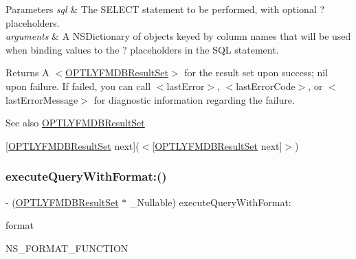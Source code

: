\begin{DoxyParams}{Parameters}
{\em sql} & The S\+E\+L\+E\+CT statement to be performed, with optional {\ttfamily ?} placeholders.\\
\hline
{\em arguments} & A {\ttfamily N\+S\+Dictionary} of objects keyed by column names that will be used when binding values to the {\ttfamily ?} placeholders in the S\+QL statement.\\
\hline
\end{DoxyParams}
\begin{DoxyReturn}{Returns}
A {\ttfamily $<$\mbox{\hyperlink{interface_o_p_t_l_y_f_m_d_b_result_set}{O\+P\+T\+L\+Y\+F\+M\+D\+B\+Result\+Set}}$>$} for the result set upon success; {\ttfamily nil} upon failure. If failed, you can call {\ttfamily $<$last\+Error$>$}, {\ttfamily $<$last\+Error\+Code$>$}, or {\ttfamily $<$last\+Error\+Message$>$} for diagnostic information regarding the failure.
\end{DoxyReturn}
\begin{DoxySeeAlso}{See also}
\mbox{\hyperlink{interface_o_p_t_l_y_f_m_d_b_result_set}{O\+P\+T\+L\+Y\+F\+M\+D\+B\+Result\+Set}} 

\mbox{[}{\ttfamily \mbox{\hyperlink{interface_o_p_t_l_y_f_m_d_b_result_set}{O\+P\+T\+L\+Y\+F\+M\+D\+B\+Result\+Set}} next}\mbox{]}($<$\mbox{[}\mbox{\hyperlink{interface_o_p_t_l_y_f_m_d_b_result_set}{O\+P\+T\+L\+Y\+F\+M\+D\+B\+Result\+Set}} next\mbox{]}$>$) 
\end{DoxySeeAlso}
\mbox{\label{interface_o_p_t_l_y_f_m_d_b_database_a679072fb9c6007f6700d3506658d9de3}} 
\subsubsection{\texorpdfstring{execute\+Query\+With\+Format\+:()}{executeQueryWithFormat:()}}
{\footnotesize\ttfamily -\/ (\mbox{\hyperlink{interface_o_p_t_l_y_f_m_d_b_result_set}{O\+P\+T\+L\+Y\+F\+M\+D\+B\+Result\+Set}} $\ast$ \+\_\+\+Nullable) execute\+Query\+With\+Format\+: \begin{DoxyParamCaption}\item[{(N\+S\+String $\ast$)}]{format }\item[{,(1)}]{ }\item[{(2)}]{N\+S\+\_\+\+F\+O\+R\+M\+A\+T\+\_\+\+F\+U\+N\+C\+T\+I\+ON }\end{DoxyParamCaption}}

